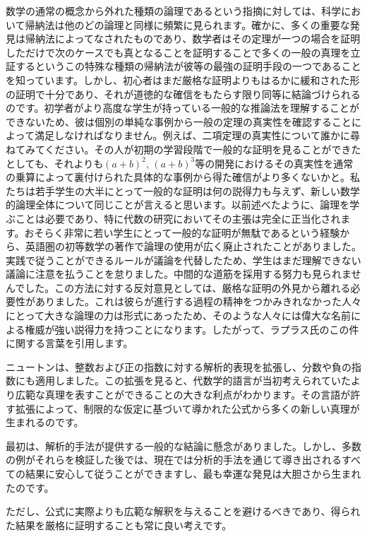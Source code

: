 \documentclass[a4paper,11pt,openany]{ltjsbook}
\begin{document}
数学の通常の概念から外れた種類の論理であるという指摘に対しては、科学において帰納法は他のどの論理と同様に頻繁に見られます。確かに、多くの重要な発見は帰納法によってなされたものであり、数学者はその定理が一つの場合を証明しただけで次のケースでも真となることを証明することで多くの一般の真理を立証するというこの特殊な種類の帰納法が彼等の最強の証明手段の一つであることを知っています。しかし、初心者はまだ厳格な証明よりもはるかに緩和された形の証明で十分であり、それが道徳的な確信をもたらす限り同等に結論づけられるのです。初学者がより高度な学生が持っている一般的な推論法を理解することができないため、彼は個別の単純な事例から一般の定理の真実性を確認することによって満足しなければなりません。例えば、二項定理の真実性について誰かに尋ねてみてください。その人が初期の学習段階で一般的な証明を見ることができたとしても、それよりも$(a + b)^{2}$, $(a + b)^{3}$等の開発におけるその真実性を通常の乗算によって裏付けられた具体的な事例から得た確信がより多くないかと。私たちは若手学生の大半にとって一般的な証明は何の説得力も与えず、新しい数学的論理全体について同じことが言えると思います。以前述べたように、論理を学ぶことは必要であり、特に代数の研究においてその主張は完全に正当化されます。おそらく非常に若い学生にとって一般的な証明が無駄であるという経験から、英語圏の初等数学の著作で論理の使用が広く廃止されたことがありました。実践で従うことができるルールが議論を代替したため、学生はまだ理解できない議論に注意を払うことを怠りました。中間的な道筋を採用する努力も見られませんでした。この方法に対する反対意見としては、厳格な証明の外見から離れる必要性がありました。これは彼らが進行する過程の精神をつかみきれなかった人々にとって大きな論理の力は形式にあったため、そのような人々には偉大な名前による権威が強い説得力を持つことになります。したがって、ラプラス氏のこの件に関する言葉を引用します。


ニュートンは、整数および正の指数に対する解析的表現を拡張し、分数や負の指数にも適用しました。この拡張を見ると、代数学的語言が当初考えられていたより広範な真理を表すことができることの大きな利点がわかります。その言語が許す拡張によって、制限的な仮定に基づいて導かれた公式から多くの新しい真理が生まれるのです。

最初は、解析的手法が提供する一般的な結論に懸念がありました。しかし、多数の例がそれらを検証した後では、現在では分析的手法を通じて導き出されるすべての結果に安心して従うことができますし、最も幸運な発見は大胆さから生まれたのです。

ただし、公式に実際よりも広範な解釈を与えることを避けるべきであり、得られた結果を厳格に証明することも常に良い考えです。
\end{document}
